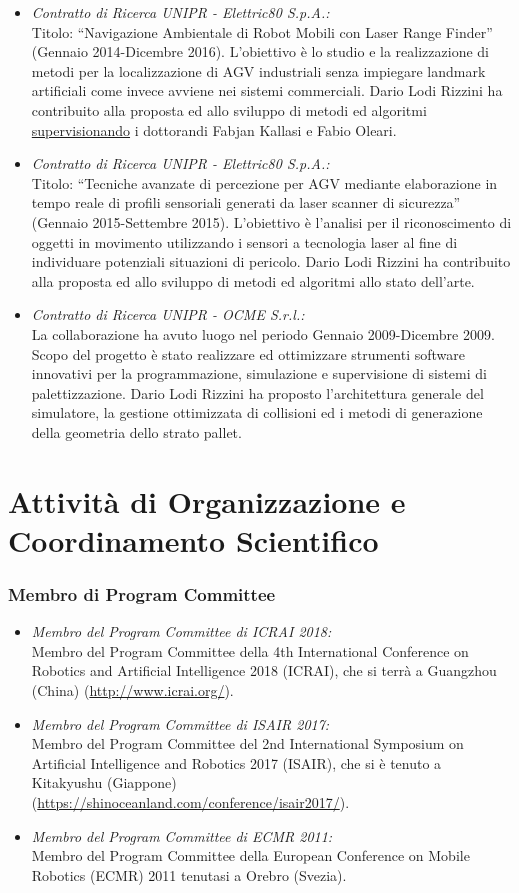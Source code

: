 \documentclass[11pt]{article}
\newcommand{\ITEMDATE}[1]{\item \textit{#1:}\\}
\begin{document}
\begin{itemize}
\ITEMDATE{Contratto di Ricerca UNIPR - Elettric80 S.p.A.} 
Titolo: ``Navigazione Ambientale di Robot Mobili con Laser Range Finder'' (Gennaio 2014-Dicembre 2016). 
L'obiettivo \`e lo studio e la realizzazione di metodi per la localizzazione di AGV industriali 
senza impiegare landmark artificiali come invece avviene nei sistemi commerciali.
Dario Lodi Rizzini ha contribuito alla proposta ed allo sviluppo di metodi ed algoritmi 
\ul{supervisionando} i dottorandi Fabjan Kallasi e Fabio Oleari.

\ITEMDATE{Contratto di Ricerca UNIPR - Elettric80 S.p.A.} 
Titolo: ``Tecniche avanzate di percezione per AGV mediante elaborazione in tempo reale di profili sensoriali generati da laser scanner di sicurezza'' (Gennaio 2015-Settembre 2015). 
L'obiettivo \`e l'analisi per il riconoscimento di oggetti in movimento utilizzando 
i sensori a tecnologia laser al fine di individuare potenziali situazioni di pericolo.
Dario Lodi Rizzini ha contribuito alla proposta ed allo sviluppo di metodi ed algoritmi 
allo stato dell'arte.

\ITEMDATE{Contratto di Ricerca UNIPR - OCME S.r.l.}
La collaborazione ha avuto luogo nel periodo Gennaio 2009-Dicembre 2009. 
Scopo del progetto \`e stato realizzare ed ottimizzare strumenti software innovativi per 
la programmazione, simulazione e supervisione di sistemi di palettizzazione.
Dario Lodi Rizzini ha proposto l'architettura generale del simulatore, la gestione 
ottimizzata di collisioni ed i metodi di generazione della geometria dello strato pallet.

\end{itemize}


\section*{Attivit\`a di Organizzazione e Coordinamento Scientifico}


\subsubsection*{Membro di Program Committee}

\begin{itemize}
\ITEMDATE{Membro del Program Committee di ICRAI 2018}
Membro del Program Committee della 4th International Conference on Robotics and Artificial Intelligence 2018 (ICRAI),  
che si terr\`a a Guangzhou (China) ({\footnotesize \url{http://www.icrai.org/}}). 
\ITEMDATE{Membro del Program Committee di ISAIR 2017}
Membro del Program Committee del 2nd International Symposium on Artificial Intelligence and Robotics 2017 (ISAIR),  
che si \`e tenuto a Kitakyushu (Giappone) \\
({\footnotesize \url{https://shinoceanland.com/conference/isair2017/}}). 
\ITEMDATE{Membro del Program Committee di ECMR 2011}
Membro del Program Committee della European Conference on Mobile Robotics (ECMR) 2011
tenutasi a Orebro (Svezia). 
\end{itemize}
\end{document}

